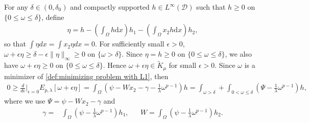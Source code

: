 \documentclass[11pt,letterpaper]{amsart}
\theoremstyle{definition}
\theoremstyle{remark}
\newcommand{\D}{\mathcal{D}}
\newcommand{\eps}{\epsilon}
\numberwithin{equation}{section}
\begin{document}
For any $\delta \in (0, \delta_{0})$ and compactly supported $h \in L^{\infty}(\D)$ such that $h \geq 0$ on $\{0 \leq \omega \leq \delta \}$, define
\begin{align*}
    \eta = h - \left(\int_{\Omega}h\mathrm{d}x\right)h_{1} - \left(\int_{\Omega}x_{2}h\mathrm{d}x\right)h_{2},
\end{align*}
so that $\int \eta dx = \int x_{2}\eta dx = 0$. For sufficiently small $\eps>0$, $\omega+\epsilon\eta\geq \delta-\epsilon\|\eta\|_{\infty}\geq 0$ on $\{\omega > \delta \}$. Since $\eta = h\geq 0$ on $\{0\leq \omega\leq \delta\}$, we also have $\omega+\epsilon\eta\geq 0 $ on $\{0\leq \omega\leq \delta\}$. Hence $\omega+\epsilon\eta\in \widetilde{K}_\mu$ for small $\eps>0$. Since $\omega$ is a minimizer of \eqref{def:minimizing problem with L1}, then
\begin{align*}
    0\geq \frac{d}{d\eps}\Bigg|_{\eps=0}E_{p,\lambda}[\omega+\eps\eta] 
    = \int_{\Omega}\left(\psi-Wx_2-\gamma-\frac{1}{\lambda}\omega^{p-1}\right)h = \int_{\omega>\delta}+\int_{0< \omega \leq \delta}\left( \Psi-\frac{1}{\lambda}\omega^{p-1} \right)h,
\end{align*}
where we use $\Psi=\psi-W x_2 -\gamma$ and
\begin{align*}
    \gamma=& \int_{\Omega}\left(\psi-\frac{1}{\lambda}\omega^{p-1}\right)h_1, && W=\int_{\Omega}\left(\psi-\frac{1}{\lambda}\omega^{p-1}\right)h_2.
\end{align*}
\end{document}
